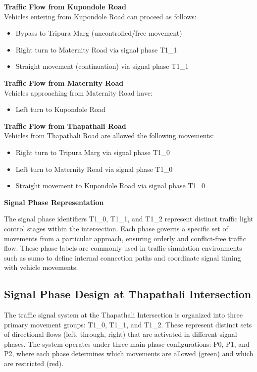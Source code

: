     \textbf{Traffic Flow from Kupondole Road} \\
    Vehicles entering from Kupondole Road can proceed as follows:
    \begin{itemize}
        \item Bypass to Tripura Marg (uncontrolled/free movement)
        \item Right turn to Maternity Road via signal phase T1\_1
        \item Straight movement (continuation) via signal phase T1\_1
    \end{itemize}

    \textbf{Traffic Flow from Maternity Road} \\
    Vehicles approaching from Maternity Road have:
    \begin{itemize}
        \item Left turn to Kupondole Road
    \end{itemize}

    \textbf{Traffic Flow from Thapathali Road} \\
    Vehicles from Thapathali Road are allowed the following movements:
    \begin{itemize}
        \item Right turn to Tripura Marg via signal phase T1\_0
        \item Left turn to Maternity Road via signal phase T1\_0
        \item Straight movement to Kupondole Road via signal phase T1\_0
    \end{itemize}

\textbf{Signal Phase Representation}
\label{sec:signal-phase-representation}

The signal phase identifiers T1\_0, T1\_1, and T1\_2 represent distinct traffic light control stages within the intersection. Each phase governs a specific set of movements from a particular approach, ensuring orderly and conflict-free traffic flow. These phase labels are commonly used in traffic simulation environments such as \gls{sumo} to define internal connection paths and coordinate signal timing with vehicle movements.

\subsection{Signal Phase Design at Thapathali Intersection}

The traffic signal system at the Thapathali Intersection is organized into three primary movement groups: T1\_0, T1\_1, and T1\_2. These represent distinct sets of directional flows (left, through, right) that are activated in different signal phases. The system operates under three main phase configurations: P0, P1, and P2, where each phase determines which movements are allowed (green) and which are restricted (red).

